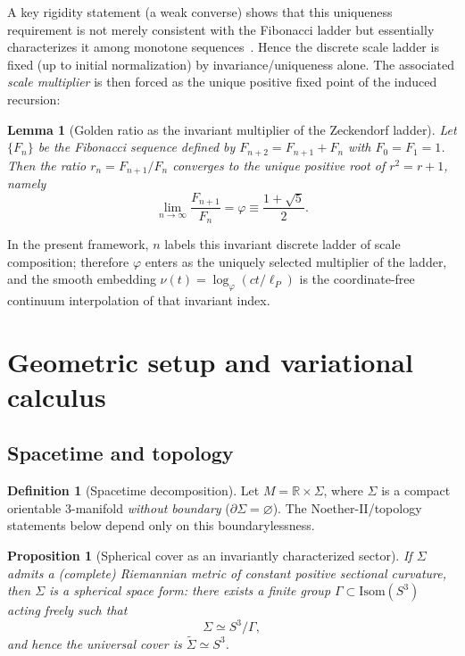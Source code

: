 \documentclass[
  reprint,
  amsmath,amssymb,
  aps,
  prd,
  superscriptaddress,
  nofootinbib,
  longbibliography
]{revtex4-2}
\newcommand{\phig}{\varphi}
\newcommand{\Sthree}{S^{3}}
\newcommand{\Sig}{\Sigma}
\newcommand{\RR}{\mathbb R}
\newtheorem{lemma}{Lemma}
\newtheorem{proposition}{Proposition}
\theoremstyle{definition}
\newtheorem{definition}{Definition}
\theoremstyle{remark}
\begin{document}
A key rigidity statement (a weak converse) shows that this uniqueness requirement is not merely consistent with the
Fibonacci ladder but essentially characterizes it among monotone sequences~\cite{Chang2020WeakConverse}. Hence the
discrete scale ladder is fixed (up to initial normalization) by invariance/uniqueness alone. The associated
\emph{scale multiplier} is then forced as the unique positive fixed point of the induced recursion:
\begin{lemma}[Golden ratio as the invariant multiplier of the Zeckendorf ladder]
\label{lem:phi_multiplier}
Let $\{F_n\}$ be the Fibonacci sequence defined by $F_{n+2}=F_{n+1}+F_n$ with $F_0=F_1=1$. Then the ratio
$r_n=F_{n+1}/F_n$ converges to the unique positive root of $r^2=r+1$, namely
\begin{equation}
\lim_{n\to\infty}\frac{F_{n+1}}{F_n}=\phig\equiv \frac{1+\sqrt{5}}{2}.
\end{equation}
\end{lemma}

In the present framework, $n$ labels this invariant discrete ladder of scale composition; therefore $\phig$ enters
as the uniquely selected multiplier of the ladder, and the smooth embedding $\nu(t)=\log_{\phig}(ct/\ell_P)$ is the
coordinate-free continuum interpolation of that invariant index.

\section{Geometric setup and variational calculus}
\subsection{Spacetime and topology}
\begin{definition}[Spacetime decomposition]
Let $M=\RR\times \Sig$, where $\Sig$ is a compact orientable 3-manifold \emph{without boundary}
($\partial\Sig=\varnothing$). The Noether-II/topology statements below depend only on this boundarylessness.
\end{definition}

\begin{proposition}[Spherical cover as an invariantly characterized sector]
\label{prop:spherical_space_form}
If $\Sig$ admits a (complete) Riemannian metric of constant \emph{positive} sectional curvature, then
$\Sig$ is a spherical space form: there exists a finite group $\Gamma\subset \mathrm{Isom}(\Sthree)$ acting freely
such that
\begin{equation}
\Sig\simeq \Sthree/\Gamma,
\end{equation}
and hence the universal cover is $\widetilde{\Sig}\simeq \Sthree$.\cite{WolfConstantCurvature,Scott3Manifolds}
\end{proposition}
\end{document}
